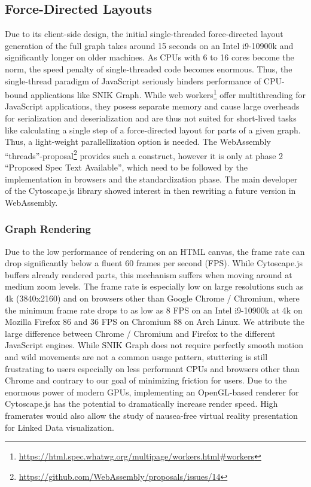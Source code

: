 \documentclass[conference]{IEEEtran}
\begin{document}
\subsection{Force-Directed Layouts}
Due to its client-side design, the initial\footnotemark{} single-threaded force-directed layout generation of the full graph takes around 15 seconds on an Intel i9-10900k and significantly longer on older machines.
%
As CPUs with 6 to 16 cores become the norm, the speed penalty of single-threaded code becomes enormous.
Thus, the single-thread paradigm of JavaScript seriously hinders performance of CPU-bound applications like SNIK Graph.
While web workers\footnote{\url{https://html.spec.whatwg.org/multipage/workers.html\#workers}} offer multithreading for JavaScript applications, they posess separate memory and cause large overheads for serialization and deserialization and are thus not suited for short-lived tasks like calculating a single step of a force-directed layout for parts of a given graph.
Thus, a light-weight parallellization option is needed.
The WebAssembly \enquote{threads}-proposal\footnote{\url{https://github.com/WebAssembly/proposals/issues/14}} provides such a construct, however it is only at phase 2 \enquote{Proposed Spec Text Available}, which need to be followed by the implementation in browsers and the standardization phase.
The main developer of the Cytoscape.js library showed interest in then rewriting a future version in WebAssembly.

\subsubsection{Graph Rendering}
Due to the low performance of rendering on an HTML canvas, the frame rate can drop significantly below a fluent 60 frames per second (FPS).
While Cytoscape.js buffers already rendered parts, this mechanism suffers when moving around at medium zoom levels.
The frame rate is especially low on large resolutions such as 4k (3840x2160) and on browsers other than Google Chrome / Chromium, where the minimum frame rate drops to as low as 8 FPS on an Intel i9-10900k at 4k on Mozilla Firefox 86 and 36 FPS on Chromium 88 on Arch Linux.
We attribute the large difference between Chrome / Chromium and Firefox to the different JavaScript engines.
While SNIK Graph does not require perfectly smooth motion and wild movements are not a common usage pattern, stuttering is still frustrating to users especially on less performant CPUs and browsers other than Chrome and contrary to our goal of minimizing friction for users. 
Due to the enormous power of modern GPUs, implementing an OpenGL-based renderer for Cytoscape.js has the potential to dramatically increase render speed.
High framerates would also allow the study of nausea-free virtual reality presentation for Linked Data visualization.
\end{document}
